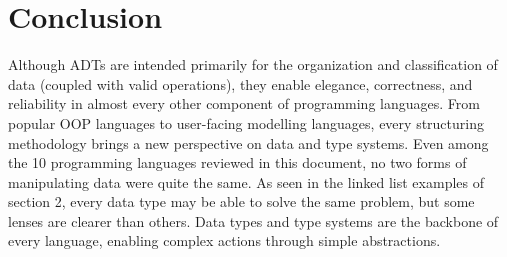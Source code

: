 \documentclass{article}
\begin{document}



\section{Conclusion}

Although ADTs are intended primarily for the organization and classification of data (coupled with valid operations),
they enable elegance, correctness, and reliability in almost every other component of programming languages.
From popular OOP languages to user-facing modelling languages, every structuring methodology
brings a new perspective on data and type systems. Even among the 10 programming languages
reviewed in this document, no two forms of manipulating data were quite the same.
As seen in the linked list examples of section 2, every data type may be able to solve the same problem,
but some lenses are clearer than others. Data types and type systems are the backbone of every language,
enabling complex actions through simple abstractions.

\pagebreak
\nocite{*} %
\printbibliography %
\end{document}
